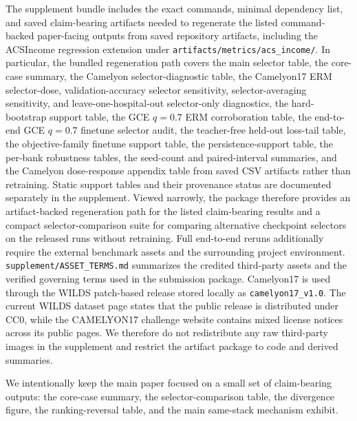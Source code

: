 The supplement bundle includes the exact commands, minimal dependency list, and saved claim-bearing artifacts needed to regenerate the listed command-backed paper-facing outputs from saved repository artifacts, including the ACSIncome regression extension under \texttt{artifacts/metrics/acs\_income/}. In particular, the bundled regeneration path covers the main selector table, the core-case summary, the Camelyon selector-diagnostic table, the Camelyon17 ERM selector-dose, validation-accuracy selector sensitivity, selector-averaging sensitivity, and leave-one-hospital-out selector-only diagnostics, the hard-bootstrap support table, the GCE $q=0.7$ ERM corroboration table, the end-to-end GCE $q=0.7$ finetune selector audit, the teacher-free held-out loss-tail table, the objective-family finetune support table, the persistence-support table, the per-bank robustness tables, the seed-count and paired-interval summaries, and the Camelyon dose-response appendix table from saved CSV artifacts rather than retraining. Static support tables and their provenance status are documented separately in the supplement. Viewed narrowly, the package therefore provides an artifact-backed regeneration path for the listed claim-bearing results and a compact selector-comparison suite for comparing alternative checkpoint selectors on the released runs without retraining. Full end-to-end reruns additionally require the external benchmark assets and the surrounding project environment. \texttt{supplement/ASSET\_TERMS.md} summarizes the credited third-party assets and the verified governing terms used in the submission package.
Camelyon17 is used through the WILDS patch-based release stored locally as \texttt{camelyon17\_v1.0}.
The current WILDS dataset page states that the public release is distributed under CC0, while the CAMELYON17 challenge website contains mixed license notices across its public pages.
We therefore do not redistribute any raw third-party images in the supplement and restrict the artifact package to code and derived summaries.

We intentionally keep the main paper focused on a small set of claim-bearing outputs:
the core-case summary, the selector-comparison table, the divergence figure, the ranking-reversal table, and the main same-stack mechanism exhibit.
